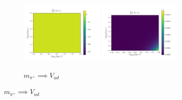 \documentclass[11pt]{article}
\begin{document}
\begin{figure}[H]
    \begin{subfigure}[b]{\textwidth}
        \centering
        \includegraphics[width=0.45\textwidth]{heatmaps/mpi-rH0.png}
        \includegraphics[width=0.45\textwidth]{heatmaps/mpi-rH1.png}
        \caption{$m_{\pi^+} \implies V_{ud}$}
    \end{subfigure}
\end{figure}
\end{document}
